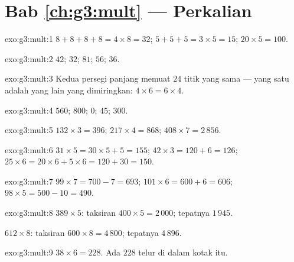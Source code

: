 \section*{Bab \ref{ch:g3:mult} --- Perkalian}

\begin{solution}{exo:g3:mult:1}
$8 + 8 + 8 + 8 = 4 \times 8 = 32$; \quad
$5 + 5 + 5 = 3 \times 5 = 15$; \quad
$20 \times 5 = 100$.
\end{solution}

\begin{solution}{exo:g3:mult:2}
$42$; \quad $32$; \quad $81$; \quad $56$; \quad $36$.
\end{solution}

\begin{solution}{exo:g3:mult:3}
Kedua persegi panjang memuat $24$ titik yang sama --- yang satu
adalah yang lain yang dimiringkan: $4 \times 6 = 6 \times 4$.
\end{solution}

\begin{solution}{exo:g3:mult:4}
$560$; \quad $800$; \quad $0$; \quad $45$; \quad $300$.
\end{solution}

\begin{solution}{exo:g3:mult:5}
$132 \times 3 = 396$; \quad
$217 \times 4 = 868$; \quad
$408 \times 7 = 2\,856$.
\end{solution}

\begin{solution}{exo:g3:mult:6}
$31 \times 5 = 30 \times 5 + 5 = 155$; \quad
$42 \times 3 = 120 + 6 = 126$; \quad
$25 \times 6 = 20 \times 6 + 5 \times 6 = 120 + 30 = 150$.
\end{solution}

\begin{solution}{exo:g3:mult:7}
$99 \times 7 = 700 - 7 = 693$; \quad
$101 \times 6 = 600 + 6 = 606$; \quad
$98 \times 5 = 500 - 10 = 490$.
\end{solution}

\begin{solution}{exo:g3:mult:8}
$389 \times 5$: taksiran $400 \times 5 = 2\,000$; tepatnya
$1\,945$.

$612 \times 8$: taksiran $600 \times 8 = 4\,800$; tepatnya $4\,896$.
\end{solution}

\begin{solution}{exo:g3:mult:9}
$38 \times 6 = 228$. Ada $228$ telur di dalam kotak itu.
\end{solution}

